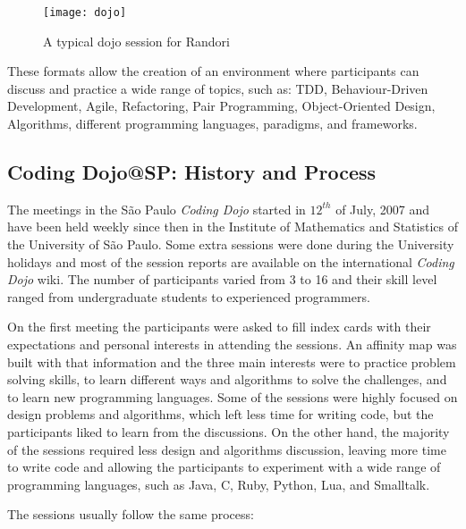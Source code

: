 \begin{figure}[htp]
\centering
\texttt{[image: dojo]}
\caption{A typical dojo session for Randori}\label{fig:dojo}
\end{figure}

These formats allow the creation of an environment where participants
can discuss and practice a wide range of topics, such as: TDD,
Behaviour-Driven Development, Agile, Refactoring, Pair Programming,
Object-Oriented Design, Algorithms, different programming languages,
paradigms, and frameworks.

\subsection{Coding Dojo@SP: History and Process}\label{subsec:dojosp}

The meetings in the São Paulo \emph{Coding Dojo} started in $12^{th}$
of July, 2007 and have been held weekly since then in the Institute of
Mathematics and Statistics of the University of São Paulo. Some extra
sessions were done during the University holidays and most of the
session reports are available on the international \emph{Coding Dojo}
wiki\cite{DojoWiki}. The number of participants varied from 3 to 16
and their skill level ranged from undergraduate students to
experienced programmers.

On the first meeting the participants were asked to fill index cards
with their expectations and personal interests in attending the
sessions. An affinity map was built with that information and the
three main interests were to practice problem solving skills, to learn
different ways and algorithms to solve the challenges, and to learn
new programming languages. Some of the sessions were highly focused on
design problems and algorithms, which left less time for writing code,
but the participants liked to learn from the discussions. On the other
hand, the majority of the sessions required less design and algorithms
discussion, leaving more time to write code and allowing the
participants to experiment with a wide range of programming languages,
such as Java, C, Ruby, Python, Lua, and Smalltalk.

The sessions usually follow the same process:


